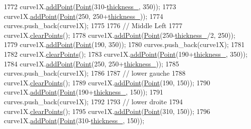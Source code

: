 \begin{DoxyCode}
1772     curve1X.\mbox{\hyperlink{class_bezier_curve_a38d16c18b36ae45619b05e26e226cf34}{addPoint}}(\mbox{\hyperlink{class_point}{Point}}(310-\mbox{\hyperlink{class_font_v1_aed8040e76be9a52833627b92f0fb4e5f}{thickness\_}}, 350));
1773     curve1X.\mbox{\hyperlink{class_bezier_curve_a38d16c18b36ae45619b05e26e226cf34}{addPoint}}(\mbox{\hyperlink{class_point}{Point}}(250, 250+\mbox{\hyperlink{class_font_v1_aed8040e76be9a52833627b92f0fb4e5f}{thickness\_}}));
1774     curves.push\_back(curve1X);
1775 
1776     \textcolor{comment}{// Middle Left}
1777     curve1X.\mbox{\hyperlink{class_bezier_curve_a0ba8ce66d5af5971ae6a1b506029728e}{clearPoints}}();
1778     curve1X.\mbox{\hyperlink{class_bezier_curve_a38d16c18b36ae45619b05e26e226cf34}{addPoint}}(\mbox{\hyperlink{class_point}{Point}}(250-\mbox{\hyperlink{class_font_v1_aed8040e76be9a52833627b92f0fb4e5f}{thickness\_}}/2, 250));
1779     curve1X.\mbox{\hyperlink{class_bezier_curve_a38d16c18b36ae45619b05e26e226cf34}{addPoint}}(\mbox{\hyperlink{class_point}{Point}}(190, 350));
1780     curves.push\_back(curve1X);
1781 
1782     curve1X.\mbox{\hyperlink{class_bezier_curve_a0ba8ce66d5af5971ae6a1b506029728e}{clearPoints}}();
1783     curve1X.\mbox{\hyperlink{class_bezier_curve_a38d16c18b36ae45619b05e26e226cf34}{addPoint}}(\mbox{\hyperlink{class_point}{Point}}(190+\mbox{\hyperlink{class_font_v1_aed8040e76be9a52833627b92f0fb4e5f}{thickness\_}}, 350));
1784     curve1X.\mbox{\hyperlink{class_bezier_curve_a38d16c18b36ae45619b05e26e226cf34}{addPoint}}(\mbox{\hyperlink{class_point}{Point}}(250, 250+\mbox{\hyperlink{class_font_v1_aed8040e76be9a52833627b92f0fb4e5f}{thickness\_}}));
1785     curves.push\_back(curve1X);
1786 
1787     \textcolor{comment}{// lower gauche}
1788     curve1X.\mbox{\hyperlink{class_bezier_curve_a0ba8ce66d5af5971ae6a1b506029728e}{clearPoints}}();
1789     curve1X.\mbox{\hyperlink{class_bezier_curve_a38d16c18b36ae45619b05e26e226cf34}{addPoint}}(\mbox{\hyperlink{class_point}{Point}}(190, 150));
1790     curve1X.\mbox{\hyperlink{class_bezier_curve_a38d16c18b36ae45619b05e26e226cf34}{addPoint}}(\mbox{\hyperlink{class_point}{Point}}(190+\mbox{\hyperlink{class_font_v1_aed8040e76be9a52833627b92f0fb4e5f}{thickness\_}}, 150));
1791     curves.push\_back(curve1X);
1792 
1793     \textcolor{comment}{// lower droite}
1794     curve1X.\mbox{\hyperlink{class_bezier_curve_a0ba8ce66d5af5971ae6a1b506029728e}{clearPoints}}();
1795     curve1X.\mbox{\hyperlink{class_bezier_curve_a38d16c18b36ae45619b05e26e226cf34}{addPoint}}(\mbox{\hyperlink{class_point}{Point}}(310, 150));
1796     curve1X.\mbox{\hyperlink{class_bezier_curve_a38d16c18b36ae45619b05e26e226cf34}{addPoint}}(\mbox{\hyperlink{class_point}{Point}}(310-\mbox{\hyperlink{class_font_v1_aed8040e76be9a52833627b92f0fb4e5f}{thickness\_}}, 150));

\end{DoxyCode}
